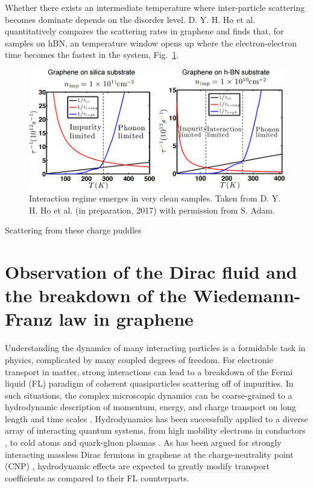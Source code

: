 Whether there exists an intermediate temperature where inter-particle scattering becomes dominate depends on the disorder level. D. Y. H. Ho et al.~\cite{adam_theoretical_2017} quantitatively compares the scattering rates in graphene and finds that, for samples on hBN, an temperature window opens up where the electron-electron time becomes the fastest in the system, Fig.~\ref{fig:scattering_Tregimes}.
\begin{figure}
\centering
\includegraphics[width=130mm]{figures/Dirac_fluid/temperature_regimes.png}
\caption{Interaction regime emerges in very clean samples. Taken from D. Y. H. Ho et al. (in preparation, 2017) with permission from S. Adam.}
\label{fig:scattering_Tregimes}
\end{figure}
Scattering from these charge puddles



\section{Observation of the Dirac fluid and the breakdown of the Wiedemann-Franz law in graphene}
Understanding the dynamics of many interacting particles is a formidable task in physics, complicated by many coupled degrees of freedom.   For electronic transport in matter, strong interactions can lead to a breakdown of the Fermi liquid (FL) paradigm of coherent quasiparticles scattering off of impurities.  In such situations, the complex microscopic dynamics can be coarse-grained to a hydrodynamic description of momentum, energy, and charge transport on long length and time scales \cite{kadanoff_hydrodynamic_1963}. Hydrodynamics has been successfully applied to a diverse array of interacting quantum systems, from high mobility electrons in conductors \cite{jong_hydrodynamic_1995}, to cold atoms \cite{cao_universal_2011} and quark-gluon plasmas \cite{shuryak_why_2004}.   As has been argued for strongly interacting massless Dirac fermions in graphene at the charge-neutrality point (CNP) \cite{muller_collective_2008, foster_slow_2009, apostolov_hydrodynamic_2014, narozhny_hydrodynamics_2015}, hydrodynamic effects are expected to greatly modify transport coefficients as compared to their FL counterparts.

